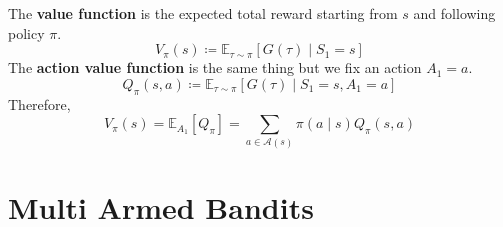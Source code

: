 \documentclass{article}
\begin{document}
  \begin{definition}
    \label{def:value-function}
    The \textbf{value function} is the expected total reward starting from $s$ and following policy $\pi$. 
    \begin{equation}
      V_\pi (s) \coloneqq \mathbb{E}_{\tau \sim \pi} [G(\tau) \mid S_1 = s]
    \end{equation}
    The \textbf{action value function} is the same thing but we fix an action $A_1 = a$. 
    \begin{equation}
      Q_{\pi} (s, a) \coloneqq \mathbb{E}_{\tau \sim \pi} [G(\tau) \mid S_1 = s, A_1 = a]
    \end{equation}
    Therefore, 
    \begin{equation}
      V_\pi (s) = \mathbb{E}_{A_1} [Q_\pi] = \sum_{a \in \mathcal{A}(s)} \pi(a \mid s) Q_\pi (s, a)
    \end{equation}
  \end{definition}  

\section{Multi Armed Bandits}
\end{document}
